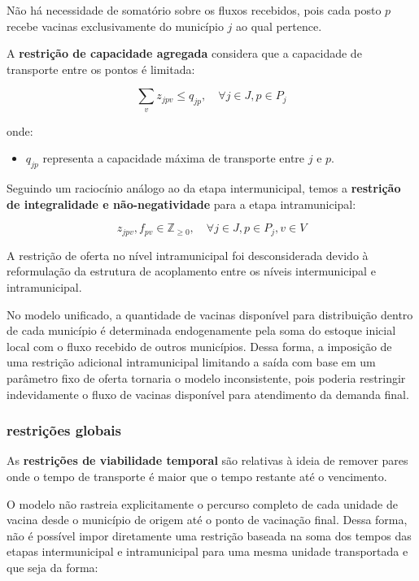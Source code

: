 Não há necessidade de somatório sobre os fluxos recebidos, pois cada posto $p$ recebe vacinas exclusivamente do município $j$ ao qual pertence.


A \textbf{restrição de capacidade agregada} considera que a capacidade de transporte entre os pontos é limitada:

\begin{equation*}
\sum_{v} z_{jpv} \le q_{jp}, \quad \forall j \in J, p \in P_j
\end{equation*}

onde:
\begin{itemize}
    \item $q_{jp}$ representa a capacidade máxima de transporte entre $j$ e $p$.
\end{itemize}

Seguindo um raciocínio análogo ao da etapa intermunicipal, temos a \textbf{restrição de integralidade e não-negatividade} para a etapa intramunicipal:

\begin{equation*}
z_{jpv}, f_{pv} \in \mathbb{Z}_{\geq 0}, \quad \forall j \in J, p \in P_j, v \in V
\end{equation*}

A restrição de oferta no nível intramunicipal foi desconsiderada devido à reformulação da estrutura de acoplamento entre os níveis intermunicipal e intramunicipal.

No modelo unificado, a quantidade de vacinas disponível para distribuição dentro de cada município é determinada endogenamente pela soma do estoque inicial local com o fluxo recebido de outros municípios. Dessa forma, a imposição de uma restrição adicional intramunicipal limitando a saída com base em um parâmetro fixo de oferta tornaria o modelo inconsistente, pois poderia restringir indevidamente o fluxo de vacinas disponível para atendimento da demanda final.


\subsubsection{restrições globais}

As \textbf{restrições de viabilidade temporal} são relativas à ideia de remover pares onde o tempo de transporte é maior que o tempo restante até o vencimento.

O modelo não rastreia explicitamente o percurso completo de cada unidade de vacina desde o município de origem até o ponto de vacinação final. Dessa forma, não é possível impor diretamente uma restrição baseada na soma dos tempos das etapas intermunicipal e intramunicipal para uma mesma unidade transportada e que seja da forma:

